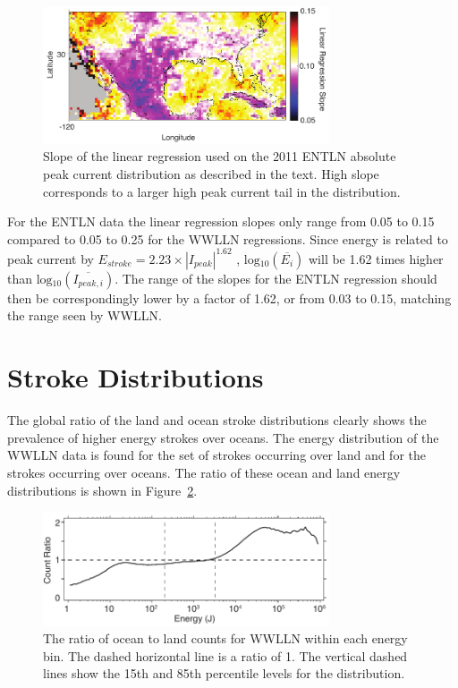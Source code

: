 \begin{figure}[ht!]
   \centering
   \noindent\includegraphics[width=20pc]{LandSea/Figures/4_regMapENTLN.pdf} 
   \caption{Slope of the linear regression used on the 2011 ENTLN absolute peak current distribution as described in the text. High slope corresponds to a larger high peak current tail in the distribution.}
   \label{landsea:fig:regMapENTLN}
\end{figure}

For the ENTLN data the linear regression slopes only range from 0.05 to 0.15 compared to 0.05 to 0.25 for the WWLLN regressions.
Since energy is related to peak current by $E_{stroke} = 2.23 \times | I_{peak} | ^{1.62}$ \citep{Hutchins2012}, $\text{log$_{10}$}(\overline{E_i})$ will be 1.62 times higher than $\text{log$_{10}$}(\overline{I_{peak,i}})$.
The range of the slopes for the ENTLN regression should then be correspondingly lower by a factor of 1.62, or from 0.03 to 0.15, matching the range seen by WWLLN.

\section{Stroke Distributions}

The global ratio of the land and ocean stroke distributions clearly shows the prevalence of higher energy strokes over oceans.
The energy distribution of the WWLLN data is found for the set of strokes occurring over land and for the strokes occurring over oceans.
The ratio of these ocean and land energy distributions is shown in Figure~\ref{landsea:fig:ratioComp}.

\begin{figure}[ht!]
   \centering
   \noindent\includegraphics[width=20pc]{LandSea/Figures/5_distribution.pdf} 
   \caption{The ratio of ocean to land counts for WWLLN within each energy bin. The dashed horizontal line is a ratio of 1. The vertical dashed lines show the 15th and 85th percentile levels for the distribution.}
   \label{landsea:fig:ratioComp}
\end{figure}

